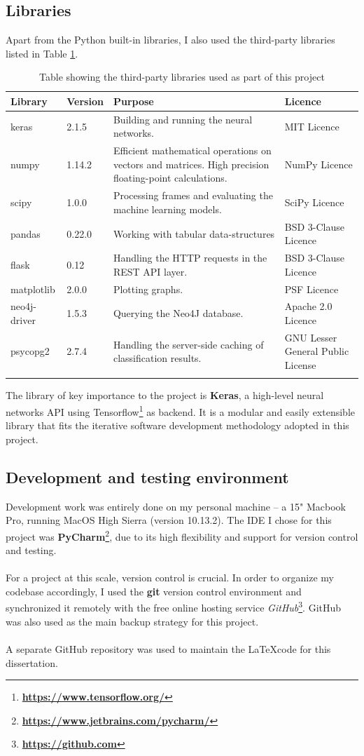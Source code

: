 	\subsection{Libraries} \label{Section 2.5.2}
	Apart from the Python built-in libraries, I also used the third-party libraries listed in Table \ref{Table 2.3}. 
	\begin{longtable}{|p{} p{} p{} p{}|}
		\textbf{Library} & \textbf{Version} & \textbf{Purpose} & \textbf{Licence}\\
		\hline
		keras & 2.1.5 & Building and running the neural networks. & MIT Licence \\
		numpy & 1.14.2 & Efficient mathematical operations on vectors and matrices. High precision floating-point calculations. & NumPy Licence\\
		scipy & 1.0.0 & Processing frames and evaluating the machine learning models. & SciPy Licence\\
		pandas & 0.22.0 & Working with tabular data-structures & BSD 3-Clause Licence\\
		flask & 0.12 & Handling the HTTP requests in the REST API layer. & BSD 3-Clause Licence\\
		matplotlib & 2.0.0 & Plotting graphs. & PSF Licence \\
		neo4j-driver & 1.5.3 & Querying the Neo4J database. & Apache 2.0 Licence\\
		psycopg2 & 2.7.4 & Handling the server-side caching of classification results. &  GNU Lesser General Public License\\
		\hline
		\caption[Libaries table]{\centering Table showing the third-party libraries used  as part of this project}
		\label{Table 2.3}
	\end{longtable} 
	The library of key importance to the project is \textbf{Keras}, a high-level neural networks API using Tensorflow\footnote{\textbf{\url{https://www.tensorflow.org/}}} as backend. It is a modular and easily extensible library that fits the iterative software development methodology adopted in this project.
	\subsection{Development and testing environment}
	Development work was entirely done on my personal machine -- a 15" Macbook Pro, running MacOS High Sierra (version 10.13.2). The IDE I chose for this project was \textbf{PyCharm}\footnote{\textbf{\url{https://www.jetbrains.com/pycharm/}}}, due to its high flexibility and support for version control and testing.
	\\ \\
	For a project at this scale, version control is crucial. In order to organize my codebase accordingly, I used the \textbf{git} version control environment and synchronized it remotely with the free online hosting service \textit{GitHub}\footnote{\textbf{\url{https://github.com}}}. GitHub was also used as the main backup strategy for this project.
	\\ \\
	A separate GitHub repository was used to maintain the \LaTeX \space code for this dissertation. 
	
